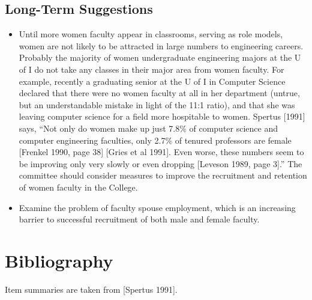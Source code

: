 \subsection{Long-Term Suggestions}
\begin{itemize}




\item
Until  more women faculty appear in  classrooms,
serving as role models, women are not likely to be attracted
in large numbers to engineering careers.  Probably  the majority of women
undergraduate engineering majors at the U of I  do not take any
classes in their major area from women faculty.  
For example,
recently a graduating senior at the U of I in Computer Science declared
that there were no women faculty at all in her department (untrue,
but an understandable mistake in light of the 11:1 ratio),
and that she was leaving computer science for a field
more hospitable to women.
Spertus [1991] says,
``Not only do women make up just 7.8\%
of computer science and computer engineering faculties, only
2.7\% of tenured professors are female [Frenkel 1990, page 38]
[Gries et al 1991]. Even worse, these numbers seem to be improving only very slowly or even dropping [Leveson 1989, page
3].''
The committee should consider measures to improve the recruitment
and retention of women faculty in the College.

\item
Examine the problem of faculty spouse employment,
which is an increasing barrier to successful recruitment of both male and 
female faculty.

\end{itemize}


\section*{Bibliography}

Item summaries are taken from [Spertus 1991].

